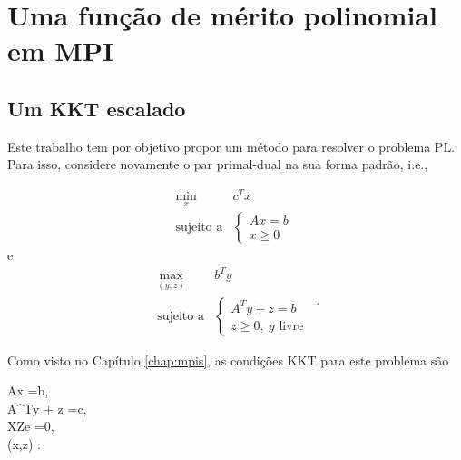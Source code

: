 





	\chapter{Uma função de mérito polinomial em \ac{MPI}}
\label{chap:merit-function}
\section{Um KKT escalado}


 
Este  trabalho tem por objetivo propor um método para resolver o problema
\ac{PL}. Para isso, considere novamente o par primal-dual na sua forma padrão,
i.e.,  

 \begin{equation*}
	\begin{array}{lc}
\displaystyle \min_{x} & c^Tx \\
\text{sujeito a} &\begin{cases} Ax = b \\
				 x \geq 0	
				 \end{cases}\
\end{array}\tag{$P$}
\end{equation*}
e 
 \begin{equation}
	\begin{array}{lc}
\displaystyle \max_{(y,z)} & b^Ty \\
\text{sujeito a} &\begin{cases} A^Ty + z = b \\
				 z \geq 0, \:y \text{ livre}	
				 \end{cases}\
\end{array}.
\tag{$D$}
\end{equation}

Como visto no Capítulo \ref{chap:mpis}, as condições \ac{KKT}  para este
problema são

\begin{subnumcases}{\label{eq:KKT-choice}}
Ax =b,\label{eq:KKT-fac-primal-choice}\\
A^Ty + z =c, \label{eq:KKT-fac-dual-choice}\\
XZe =0,  \label{eq:KKT-complementar-choice}\\
(x,z) \geq 0. \label{eq:KKT-nao-negativ-choice}
\end{subnumcases}


